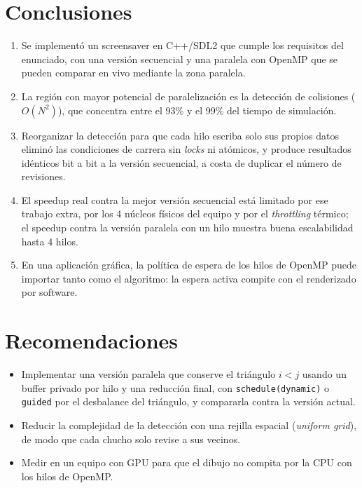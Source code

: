 \documentclass[11pt,letterpaper]{article}
\newcommand{\codigo}[1]{\texttt{#1}}
\begin{document}
\section{Conclusiones}

\begin{enumerate}
  \item Se implementó un screensaver en C++/SDL2 que cumple los requisitos del
  enunciado, con una versión secuencial y una paralela con OpenMP que se
  pueden comparar en vivo mediante la zona paralela.
  \item La región con mayor potencial de paralelización es la detección de
  colisiones ($O(N^2)$), que concentra entre el 93\% y el 99\% del tiempo de
  simulación.
  \item Reorganizar la detección para que cada hilo escriba solo sus propios
  datos eliminó las condiciones de carrera sin \emph{locks} ni atómicos, y
  produce resultados idénticos bit a bit a la versión secuencial, a costa de
  duplicar el número de revisiones.
  \item El speedup real contra la mejor versión secuencial está limitado por
  ese trabajo extra, por los 4 núcleos físicos del equipo y por el
  \emph{throttling} térmico; el speedup contra la versión paralela con un hilo
  muestra buena escalabilidad hasta 4 hilos.
  \item En una aplicación gráfica, la política de espera de los hilos de
  OpenMP puede importar tanto como el algoritmo: la espera activa compite con
  el renderizado por software.
\end{enumerate}

\section{Recomendaciones}

\begin{itemize}
  \item Implementar una versión paralela que conserve el triángulo $i<j$
  usando un buffer privado por hilo y una reducción final, con
  \codigo{schedule(dynamic)} o \codigo{guided} por el desbalance del
  triángulo, y compararla contra la versión actual.
  \item Reducir la complejidad de la detección con una rejilla espacial
  (\emph{uniform grid}), de modo que cada chucho solo revise a sus vecinos.
  \item Medir en un equipo con GPU para que el dibujo no compita por la CPU
  con los hilos de OpenMP.
\end{itemize}
\end{document}
